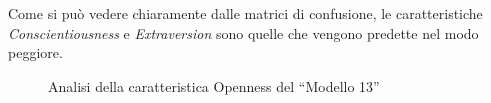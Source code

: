 Come si può vedere chiaramente dalle matrici di confusione, le caratteristiche \emph{Conscientiousness} e \emph{Extraversion} sono quelle che vengono predette nel modo peggiore.

\begin{figure}[H]
	\centering
	\hspace{10mm}
	\caption{Analisi della caratteristica Openness del ``Modello 13''}
	\label{fig:binO}
\end{figure}

